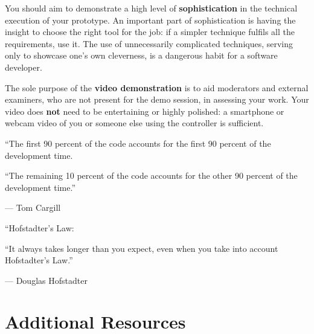 \documentclass{../fal_assignment}
\begin{document}
You should aim to demonstrate a high level of \textbf{sophistication}
in the technical execution of your prototype.
An important part of sophistication is having the insight to choose the right tool for the job:
if a simpler technique fulfils all the requirements, use it.
The use of unnecessarily complicated techniques, serving only to showcase one's own cleverness,
is a dangerous habit for a software developer.

The sole purpose of the \textbf{video demonstration} is to aid moderators and external examiners,
who are not present for the demo session,
in assessing your work.
Your video does \textbf{not} need to be entertaining or highly polished:
a smartphone or webcam video of you or someone else using the controller is sufficient.

%

\begin{marginquote}
    ``The first 90 percent of the code accounts for the first 90 percent of the development time.
    
    ``The remaining 10 percent of the code accounts for the other 90 percent of the development time.''
    
    --- Tom Cargill
    
    \marginquoterule
    
    ``Hofstadter's Law:
    
    ``It always takes longer than you expect, even when you take into account Hofstadter's Law.''
    
    --- Douglas Hofstadter
\end{marginquote}

\section*{Additional Resources}
\end{document}
